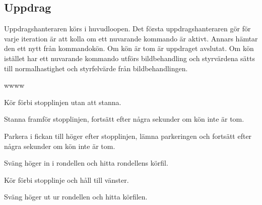 \documentclass[tekniskrapport/tech.tex]{subfiles}
\begin{document}
\subsection{Uppdrag} \label{sec:comm-mission}
Uppdragshanteraren körs i huvudloopen. Det första uppdragshanteraren gör för
varje iteration är att kolla om ett nuvarande kommando är aktivt. Annars hämtar
den ett nytt från kommandokön. Om kön är tom är uppdraget avslutat. Om kön
istället har ett nuvarande kommando utförs bildbehandling och styrvärdena sätts
till normalhastighet och styrfelvärde från bildbehandlingen. 

\begin{labeling}{wwww}
    \item[\commIgnore] Kör förbi stopplinjen utan att stanna.
    \item[\commStop] Stanna framför stopplinjen, fortsätt efter några sekunder
    om kön inte är tom.
    \item[\commPark] Parkera i fickan till höger efter stopplinjen, lämna
    parkeringen och fortsätt efter några sekunder om kön inte är tom.
    \item[\commEnter] Sväng höger in i rondellen och hitta rondellens körfil.
    \item[\commContinue] Kör förbi stopplinje och håll till vänster.
    \item[\commExit] Sväng höger ut ur rondellen och hitta körfilen.
\end{labeling}
\end{document}

